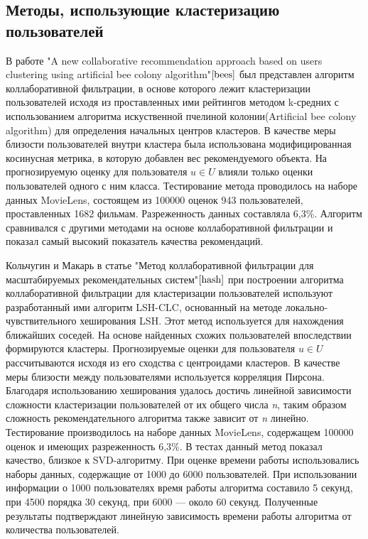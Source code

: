 \documentclass[12pt]{article} %
\begin{document}
\subsection{Методы, использующие кластеризацию пользователей}
\par
В работе "A new collaborative recommendation approach based on users clustering using artificial bee colony algorithm"$\cite{bees}$ был представлен алгоритм коллаборативной фильтрации, в основе которого лежит кластеризации пользователей исходя из проставленных ими рейтингов методом k-средних с использованием алгоритма искуственной пчелиной колонии(Artificial bee colony algorithm) для определения начальных центров кластеров. В качестве меры близости пользователей внутри кластера была использована модифицированная косинусная метрика, в которую добавлен вес рекомендуемого объекта. На прогнозируемую оценку для пользователя $u \in U$  влияли только оценки пользователей одного с ним класса. Тестирование метода проводилось на наборе данных MovieLens, состоящем из 100000 оценок 943 пользователей, проставленных 1682 фильмам. Разреженность данных составляла 6,3\%. Алгоритм сравнивался с другими методами на основе коллаборативной фильтрации и показал самый высокий показатель качества рекомендаций.

\par 
Кольчугин и Макарь в статье "Метод коллаборативной фильтрации для масштабируемых рекомендательных систем"$\cite{hash}$ при построении алгоритма коллаборативной фильтрации для кластеризации пользователей используют разработанный ими алгоритм LSH-CLC, основанный на методе локально-чувствительного хеширования LSH. Этот метод используется для нахождения ближайших соседей. На основе найденных схожих пользователей впоследствии формируются кластеры. Прогнозируемые оценки для пользователя $u \in U$ рассчитываются исходя из его сходства с центроидами кластеров. В качестве меры близости между пользователями используется корреляция Пирсона. Благодаря использованию хеширования удалось достичь линейной зависимости сложности кластеризации пользователей от их общего числа \textit{n}, таким образом сложность рекомендательного алгоритма также зависит от \textit{n} линейно. Тестирование производилось на наборе данных MovieLens, содержащем 100000 оценок и имеющих разреженность 6,3\%. В тестах данный метод показал качество, близкое к SVD-алгоритму. При оценке времени работы использовались наборы данных, содержащие от 1000 до 6000 пользователей. При использовании информации о 1000 пользователях время работы алгоритма составило 5 секунд, при 4500 порядка 30 секунд, при 6000 --- около 60 секунд. Полученные результаты подтверждают линейную зависимость времени работы алгоритма от количества пользователей.  
\end{document}
